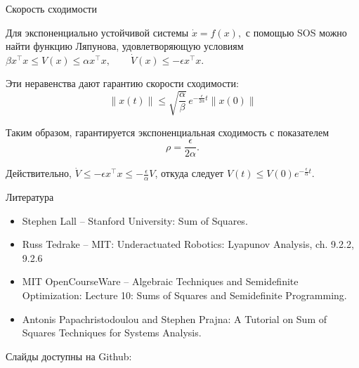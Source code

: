 \documentclass{beamer}
\newcommand{\myqrframe}{
	\begin{frame}
		\centerline{Слайды доступны на Github:}
		\bigskip
		\centerline{\mygit}
		\bigskip
		\myqr
	\end{frame}
}
\begin{document}
\begin{frame}{Скорость сходимости}
	\begin{flushleft}
		Для экспоненциально устойчивой системы
		\(
		\dot{x}=f(x),
		\)
		с помощью SOS можно найти функцию Ляпунова, удовлетворяющую условиям
		\(
		\beta x^\top x
		\le V(x)\le
		\alpha x^\top x,
		\qquad
		\dot V(x)\le-\epsilon x^\top x.
		\)
		
		\bigskip
		
		Эти неравенства дают гарантию скорости сходимости:
		\[
		\boxed{
			\|x(t)\|
			\le
			\sqrt{\frac{\alpha}{\beta}}\,
			e^{-\frac{\epsilon}{2\alpha}t}
			\|x(0)\|
		}
		\]
		
		Таким образом, гарантируется экспоненциальная сходимость
		с показателем
		\[
		\boxed{\rho=\frac{\epsilon}{2\alpha}}.
		\]
		
		\bigskip
		
		Действительно, $
		\dot V
		\le-\epsilon x^\top x
		\le-\frac{\epsilon}{\alpha}V
		$, 
		откуда следует
		$
		V(t)\le V(0)e^{-\frac{\epsilon}{\alpha}t}.
		$
	\end{flushleft}
	
\end{frame}



\begin{frame}{Литература}
	
	\begin{itemize}
		
		\item Stephen Lall -- Stanford University:
		{Sum of Squares.}
		
		\item Russ Tedrake -- MIT:
		{Underactuated Robotics: Lyapunov Analysis, ch. 9.2.2, 9.2.6}
		
		\item MIT OpenCourseWare -- Algebraic Techniques and Semidefinite Optimization:
		{Lecture 10: Sums of Squares and Semidefinite Programming.}
		
		\item Antonis Papachristodoulou and Stephen Prajna:
		{A Tutorial on Sum of Squares Techniques for Systems Analysis.}
		
		
	\end{itemize}
	
\end{frame}


\myqrframe
\end{document}
